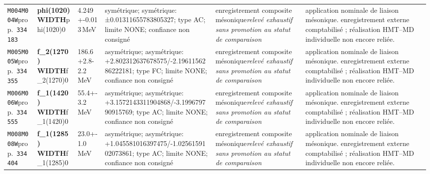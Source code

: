 \begin{landscape}
\begin{longtable}{L{1.85cm}L{4.45cm}L{2.35cm}L{4.05cm}L{3.35cm}L{7.15cm}}
\texttt{M004}\newline \texttt{M004W}\newline prop.\ \texttt{334183} & \textbf{phi(1020) WIDTH}\newline phi(1020)0 & 4.249+-0.013\,MeV & symétrique; symétrique: ±0.01311655783805327; type AC; limite NONE; confiance non consigné & enregistrement composite mésonique\newline \emph{relevé exhaustif sans promotion au statut de comparaison} & application nominale de liaison mésonique. enregistrement externe comptabilisé ; réalisation HMT--MD individuelle non encore reliée. \\
\texttt{M005}\newline \texttt{M005W}\newline prop.\ \texttt{334355} & \textbf{f\_\allowbreak{}2(1270) WIDTH}\newline f\_\allowbreak{}2(1270)0 & 186.6+2.8-2.2\,MeV & asymétrique; asymétrique: +2.802312637678575/-2.1961156286222181; type FC; limite NONE; confiance non consigné & enregistrement composite mésonique\newline \emph{relevé exhaustif sans promotion au statut de comparaison} & application nominale de liaison mésonique. enregistrement externe comptabilisé ; réalisation HMT--MD individuelle non encore reliée. \\
\texttt{M006}\newline \texttt{M006W}\newline prop.\ \texttt{334555} & \textbf{f\_\allowbreak{}1(1420) WIDTH}\newline f\_\allowbreak{}1(1420)0 & 55.4+-3.2\,MeV & asymétrique; asymétrique: +3.1572143311904868/-3.199679790915769; type AC; limite NONE; confiance non consigné & enregistrement composite mésonique\newline \emph{relevé exhaustif sans promotion au statut de comparaison} & application nominale de liaison mésonique. enregistrement externe comptabilisé ; réalisation HMT--MD individuelle non encore reliée. \\
\texttt{M008}\newline \texttt{M008W}\newline prop.\ \texttt{334404} & \textbf{f\_\allowbreak{}1(1285) WIDTH}\newline f\_\allowbreak{}1(1285)0 & 23.0+-1.0\,MeV & asymétrique; asymétrique: +1.045581016397475/-1.0256159102073861; type AC; limite NONE; confiance non consigné & enregistrement composite mésonique\newline \emph{relevé exhaustif sans promotion au statut de comparaison} & application nominale de liaison mésonique. enregistrement externe comptabilisé ; réalisation HMT--MD individuelle non encore reliée. \\

\end{longtable}
\end{landscape}
